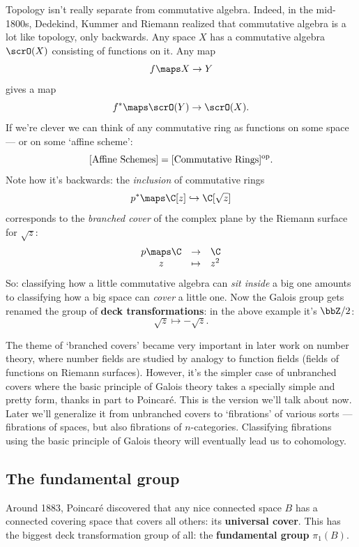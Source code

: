 \documentclass{amsart}
\begin{document}
Topology isn't really separate from commutative algebra.
Indeed, in the mid-1800s, Dedekind, Kummer and Riemann realized that
commutative algebra is a lot like topology, only backwards.  Any space
$X$ has a commutative algebra $\scrO(X)$ consisting of functions on
it.  Any map
\[               f \maps X \to Y  \]
gives a map 
\[               f^\ast \maps \scrO(Y) \to \scrO(X)  .\]
If we're clever we can think of any commutative 
ring as functions on some space --- or on some `affine scheme':
\[   [\textrm{Affine Schemes}] = [\textrm{Commutative Rings}]^{\rm op}  .\]
Note how it's backwards: the {\it inclusion} of commutative rings
\[      p^\ast \maps \C[z] \hookrightarrow \C[\sqrt{z}]  \]
corresponds to the {\it branched cover} of the complex plane
by the Riemann surface for $\sqrt{z}$:
\[ 
\begin{array}{ccl}
         p \maps   \C &\to & \C    \\
              z &\mapsto& z^2 
\end{array}
\] 
So: classifying how a little commutative algebra can {\it sit inside} a 
big one amounts to classifying how a big space can {\it cover} a little one. 
Now the Galois group gets renamed the group of {\bf deck transformations}:
in the above example it's $\bbZ/2$:
\[              \sqrt{z} \mapsto -\sqrt{z}  .\]

The theme of `branched covers' became very important in later work on
number theory, where number fields are studied by analogy to function
fields (fields of functions on Riemann surfaces).  However, it's the
simpler case of unbranched covers where the basic principle of Galois
theory takes a specially simple and pretty form, thanks in part to
Poincar\'e.  This is the version we'll talk about now.  Later we'll 
generalize it from unbranched covers to `fibrations' of various sorts ---
fibrations of spaces, but also fibrations of $n$-categories.  Classifying
fibrations using the basic principle of Galois theory will eventually 
lead us to cohomology.

\subsection{The fundamental group}
\label{sec:fundamental group}

Around 1883, Poincar\'e discovered that any nice connected
space $B$ has a connected covering space 
that covers all others: its {\bf universal cover}.  This has
the biggest deck transformation group of all: the {\bf fundamental
group} $\pi_1(B)$.  
\end{document}
